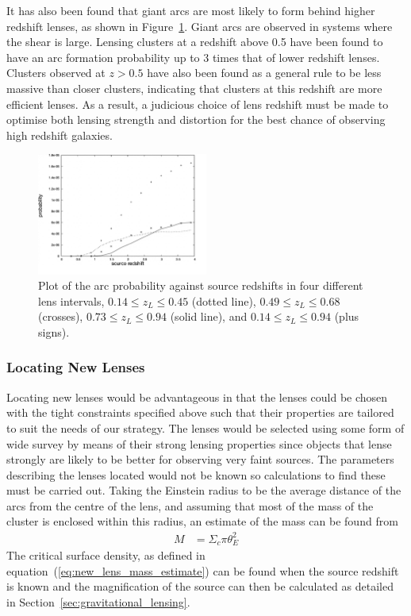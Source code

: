 		It has also been found that giant arcs are most likely to form behind higher redshift lenses, as shown in Figure~\ref{fig:Arc_probability}. Giant arcs are observed in systems where the shear is large. Lensing clusters at a redshift above 0.5 have been found to have an arc formation probability up to 3 times that of lower redshift lenses. Clusters observed at $z>0.5$ have also been found as a general rule to be less massive than closer clusters, indicating that clusters at this redshift are more efficient lenses. As a result, a judicious choice of lens redshift must be made to optimise both lensing strength and distortion for the best chance of observing high redshift galaxies\cite{wu_and_chiueh}.
		\begin{figure}[!htbp]
			\centering
				\includegraphics[width=0.5\textwidth]{../Images/Arc_probability.png}
			\caption[Arc probability]{\cite{wu_and_chiueh}Plot of the arc probability against source redshifts in four different lens intervals, $0.14\le z_L\le 0.45$ (dotted line), $0.49\le z_L\le 0.68$ (crosses), $0.73\le z_L\le 0.94$ (solid line), and $0.14\le z_L\le 0.94$ (plus signs).\label{fig:Arc_probability}}
		\end{figure}

	\subsubsection{Locating New Lenses} %
	\label{sub:locating_new_lenses}
		Locating new lenses would be advantageous in that the lenses could be chosen with the tight constraints specified above such that their properties are tailored to suit the needs of our strategy. The lenses would be selected using some form of wide survey by means of their strong lensing properties since objects that lense strongly are likely to be better for observing very faint sources. The parameters describing the lenses located would not be known so calculations to find these must be carried out. Taking the Einstein radius to be the average distance of the arcs from the centre of the lens, and assuming that most of the mass of the cluster is enclosed within this radius, an estimate of the mass can be found from
		\begin{align}
			M &= \Sigma_c\pi \theta_E^2 \label{eq:new_lens_mass_estimate}
		\end{align}
		The critical surface density, as defined in equation~(\ref{eq:new_lens_mass_estimate}) can be found when the source redshift is known and the magnification of the source can then be calculated as detailed in Section~\ref{sec:gravitational_lensing}.

